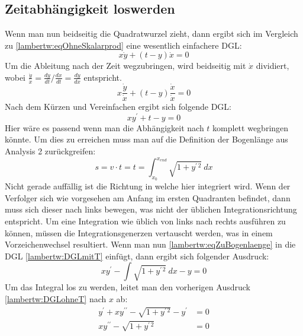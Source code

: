 \subsection{Zeitabhängigkeit loswerden
	\label{lambertw:subsection:ZeitabhLoswerden}}
Wenn man nun beidseitig die Quadratwurzel zieht, dann ergibt sich im Vergleich zu \eqref{lambertw:eqOhneSkalarprod} eine wesentlich einfachere DGL:
\begin{equation}
	x \dot{y} + (t-y) \dot{x}
	= 0
	\label{lambertw:equation5}
\end{equation}
Um die Ableitung nach der Zeit wegzubringen, wird beidseitig mit \(\dot{x}\) dividiert, wobei \(\frac{\dot{y}}{\dot{x}} = \frac{dy}{dt}/\frac{dx}{dt} = \frac{dy}{dx}\) entspricht.
\[
	x \frac{\dot{y}}{\dot{x}} + (t-y) \frac{\dot{x}}{\dot{x}}
	= 0
\]
Nach dem Kürzen und Vereinfachen ergibt sich folgende DGL:
\begin{equation}
	x y^{\prime} + t - y
	= 0
	\label{lambertw:DGLmitT}
\end{equation}
Hier wäre es passend wenn man die Abhängigkeit nach \(t\) komplett wegbringen könnte. Um dies zu erreichen muss man auf die Definition der Bogenlänge aus Analysis 2 zurückgreifen:
\begin{equation}
	s
	= 
	v \cdot t
	=
	t
	=
	\int_{x_0}^{x_{end}}\sqrt{1+y^{\prime\, 2}} \: dx
	\label{lambertw:eqZuBogenlaenge}
\end{equation}
Nicht gerade auffällig ist die Richtung in welche hier integriert wird. Wenn der Verfolger sich wie vorgesehen am Anfang im ersten Quadranten befindet, dann muss sich dieser nach links bewegen, was nicht der üblichen Integrationsrichtung entspricht. Um eine Integration wie üblich von links nach rechts ausführen zu können, müssen die Integrationsgenerzen vertauscht werden, was in einem Vorzeichenwechsel resultiert. Wenn man nun \eqref{lambertw:eqZuBogenlaenge} in die DGL \eqref{lambertw:DGLmitT} einfügt, dann ergibt sich folgender Ausdruck:
\begin{equation}
	x y^{\prime} - \int\sqrt{1+y^{\prime\, 2}} \: dx - y
	= 0
	\label{lambertw:DGLohneT}
\end{equation}
Um das Integral los zu werden, leitet man den vorherigen Ausdruck \eqref{lambertw:DGLohneT} nach \(x\) ab:
\begin{align*}
	y^{\prime}+ xy^{\prime\prime} - \sqrt{1+y^{\prime\, 2}} - y^{\prime}
	&= 0 \\
	xy^{\prime\prime} - \sqrt{1+y^{\prime\, 2}}
	&= 0
\end{align*}

